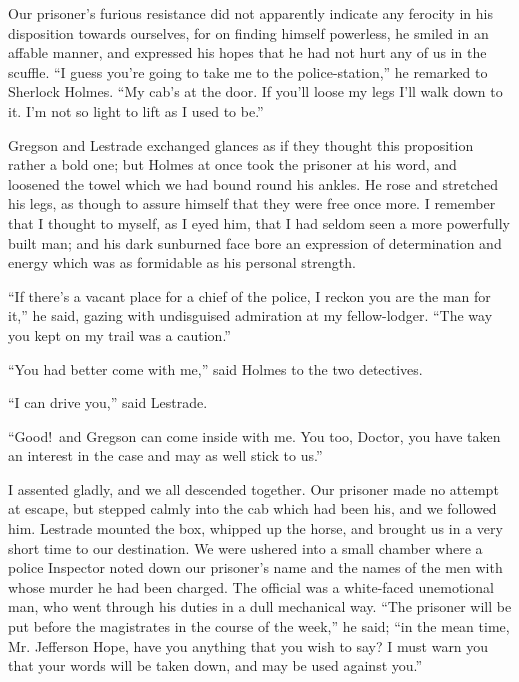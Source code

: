 \documentclass[12pt,english,oneside]{book}
\begin{document}


Our prisoner's furious resistance did not apparently indicate any
ferocity in his disposition towards ourselves, for on finding himself
powerless, he smiled in an affable manner, and expressed his hopes
that he had not hurt any of us in the scuffle. {}``I guess you're
going to take me to the police-station,'' he remarked to Sherlock
Holmes. {}``My cab's at the door. If you'll loose my legs I'll walk
down to it. I'm not so light to lift as I used to be.''

Gregson and Lestrade exchanged glances as if they thought this proposition
rather a bold one; but Holmes at once took the prisoner at his word,
and loosened the towel which we had bound round his ankles. He rose
and stretched his legs, as though to assure himself that they were
free once more. I remember that I thought to myself, as I eyed him,
that I had seldom seen a more powerfully built man; and his dark sunburned
face bore an expression of determination and energy which was as formidable
as his personal strength.

{}``If there's a vacant place for a chief of the police, I reckon
you are the man for it,'' he said, gazing with undisguised admiration
at my fellow-lodger. {}``The way you kept on my trail was a caution.''

{}``You had better come with me,'' said Holmes to the two detectives.

{}``I can drive you,'' said Lestrade.

{}``Good!\ and Gregson can come inside with me. You too, Doctor,
you have taken an interest in the case and may as well stick to us.''

I assented gladly, and we all descended together. Our prisoner made
no attempt at escape, but stepped calmly into the cab which had been
his, and we followed him. Lestrade mounted the box, whipped up the
horse, and brought us in a very short time to our destination. We
were ushered into a small chamber where a police Inspector noted down
our prisoner's name and the names of the men with whose murder he
had been charged. The official was a white-faced unemotional man,
who went through his duties in a dull mechanical way. {}``The prisoner
will be put before the magistrates in the course of the week,'' he
said; {}``in the mean time, Mr. Jefferson Hope, have you anything
that you wish to say? I must warn you that your words will be taken
down, and may be used against you.''
\end{document}
